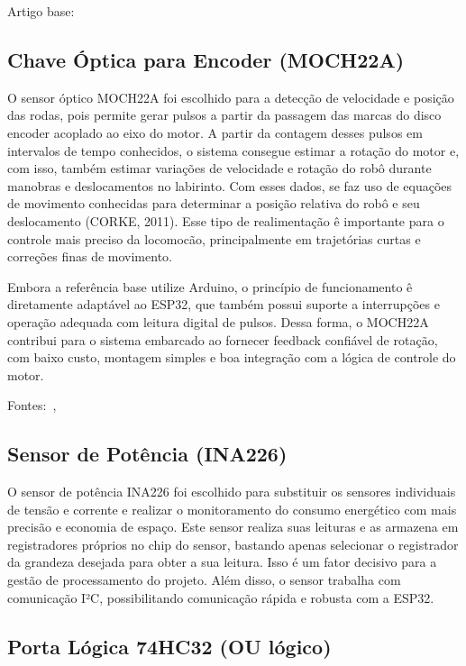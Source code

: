 Artigo base: \cite{oliveira2024_esp32_roboticar}

\subsection{Chave Óptica para Encoder (MOCH22A)}

O sensor óptico MOCH22A foi escolhido para a detecção de velocidade e posição das rodas, pois permite gerar pulsos a partir da passagem das marcas do disco encoder acoplado ao eixo do motor. A partir da contagem desses pulsos em intervalos de tempo conhecidos, o sistema consegue estimar a rotação do motor e, com isso, também estimar variações de velocidade e rotação do rob\^o durante manobras e deslocamentos no labirinto. Com esses dados, se faz uso de equações de movimento conhecidas para determinar a posição relativa do robô e seu deslocamento (CORKE, 2011). Esse tipo de realimenta\c{c}\~ao \^e importante para o controle mais preciso da locomoc\~ao, principalmente em trajet\'orias curtas e corre\c{c}\~oes finas de movimento.

Embora a refer\^encia base utilize Arduino, o princ\'ipio de funcionamento \^e diretamente adapt\'avel ao ESP32, que tamb\'em possui suporte a interrup\c{c}\~oes e opera\c{c}\~ao adequada com leitura digital de pulsos. Dessa forma, o MOCH22A contribui para o sistema embarcado ao fornecer feedback confi\'avel de rota\c{c}\~ao, com baixo custo, montagem simples e boa integra\c{c}\~ao com a l\'ogica de controle do motor.

Fontes:~\cite{makerhero_moch22a}, \cite{petercorke}

\subsection{Sensor de Potência (INA226)}

O sensor de potência INA226 foi escolhido para substituir os sensores individuais de tensão e corrente e realizar o monitoramento do consumo energético com mais precisão e economia de espaço. Este sensor realiza suas leituras e as armazena em registradores próprios no chip do sensor, bastando apenas selecionar o registrador da grandeza desejada para obter a sua leitura. Isso é um fator decisivo para a gestão de processamento do projeto. Além disso, o sensor trabalha com comunicação I²C, possibilitando comunicação rápida e robusta com a ESP32.

\subsection{Porta Lógica 74HC32 (OU lógico)}

